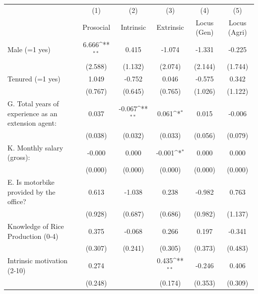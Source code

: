 {
\def\sym#1{\ifmmode^{#1}\else\(^{#1}\)\fi}
\begin{tabular}{l*{5}{c}}
\hline\hline
                    &\multicolumn{1}{c}{(1)}         &\multicolumn{1}{c}{(2)}         &\multicolumn{1}{c}{(3)}         &\multicolumn{1}{c}{(4)}         &\multicolumn{1}{c}{(5)}         \\
                    &Prosocial         &Intrinsic         &Extrinsic         &Locus (Gen)         &Locus (Agri)         \\
\hline
Male (=1 yes)       &6.666\sym{**} &0.415         &-1.074         &-1.331         &-0.225         \\
                    &(2.588)         &(1.132)         &(2.074)         &(2.144)         &(1.744)         \\
Tenured (=1 yes)    &1.049         &-0.752         &0.046         &-0.575         &0.342         \\
                    &(0.767)         &(0.645)         &(0.765)         &(1.026)         &(1.122)         \\
G. Total years of experience as an extension agent:&0.037         &-0.067\sym{**} &0.061\sym{*}  &0.015         &-0.006         \\
                    &(0.038)         &(0.032)         &(0.033)         &(0.056)         &(0.079)         \\
K. Monthly salary (gross):&-0.000         &0.000         &-0.001\sym{*}  &0.000         &0.000         \\
                    &(0.000)         &(0.000)         &(0.000)         &(0.000)         &(0.000)         \\
E. Is motorbike provided by the office?&0.613         &-1.038         &0.238         &-0.982         &0.763         \\
                    &(0.928)         &(0.687)         &(0.686)         &(0.982)         &(1.137)         \\
Knowledge of Rice Production (0-4)&0.375         &-0.068         &0.266         &0.197         &-0.341         \\
                    &(0.307)         &(0.241)         &(0.305)         &(0.373)         &(0.483)         \\
Intrinsic motivation (2-10)&0.274         &              &0.435\sym{**} &-0.246         &0.406         \\
                    &(0.248)         &              &(0.174)         &(0.353)         &(0.309)         \\

\end{tabular}}
